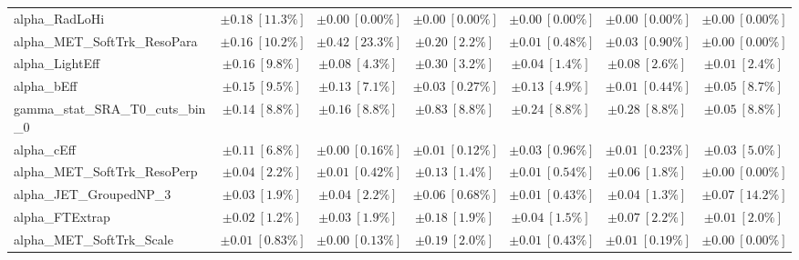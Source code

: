 \begin{sidewaystable}
\begin{center}
\begin{tabular*}{\textwidth}{@{\extracolsep{\fill}}lcccccc}
alpha\_RadLoHi         & $\pm 0.18\ [11.3\%] $          & $\pm 0.00\ [0.00\%] $          & $\pm 0.00\ [0.00\%] $          & $\pm 0.00\ [0.00\%] $          & $\pm 0.00\ [0.00\%] $          & $\pm 0.00\ [0.00\%] $       \\
alpha\_MET\_SoftTrk\_ResoPara         & $\pm 0.16\ [10.2\%] $          & $\pm 0.42\ [23.3\%] $          & $\pm 0.20\ [2.2\%] $          & $\pm 0.01\ [0.48\%] $          & $\pm 0.03\ [0.90\%] $          & $\pm 0.00\ [0.00\%] $       \\
alpha\_LightEff         & $\pm 0.16\ [9.8\%] $          & $\pm 0.08\ [4.3\%] $          & $\pm 0.30\ [3.2\%] $          & $\pm 0.04\ [1.4\%] $          & $\pm 0.08\ [2.6\%] $          & $\pm 0.01\ [2.4\%] $       \\
alpha\_bEff         & $\pm 0.15\ [9.5\%] $          & $\pm 0.13\ [7.1\%] $          & $\pm 0.03\ [0.27\%] $          & $\pm 0.13\ [4.9\%] $          & $\pm 0.01\ [0.44\%] $          & $\pm 0.05\ [8.7\%] $       \\
gamma\_stat\_SRA\_T0\_cuts\_bin\_0         & $\pm 0.14\ [8.8\%] $          & $\pm 0.16\ [8.8\%] $          & $\pm 0.83\ [8.8\%] $          & $\pm 0.24\ [8.8\%] $          & $\pm 0.28\ [8.8\%] $          & $\pm 0.05\ [8.8\%] $       \\
alpha\_cEff         & $\pm 0.11\ [6.8\%] $          & $\pm 0.00\ [0.16\%] $          & $\pm 0.01\ [0.12\%] $          & $\pm 0.03\ [0.96\%] $          & $\pm 0.01\ [0.23\%] $          & $\pm 0.03\ [5.0\%] $       \\
alpha\_MET\_SoftTrk\_ResoPerp         & $\pm 0.04\ [2.2\%] $          & $\pm 0.01\ [0.42\%] $          & $\pm 0.13\ [1.4\%] $          & $\pm 0.01\ [0.54\%] $          & $\pm 0.06\ [1.8\%] $          & $\pm 0.00\ [0.00\%] $       \\
alpha\_JET\_GroupedNP\_3         & $\pm 0.03\ [1.9\%] $          & $\pm 0.04\ [2.2\%] $          & $\pm 0.06\ [0.68\%] $          & $\pm 0.01\ [0.43\%] $          & $\pm 0.04\ [1.3\%] $          & $\pm 0.07\ [14.2\%] $       \\
alpha\_FTExtrap         & $\pm 0.02\ [1.2\%] $          & $\pm 0.03\ [1.9\%] $          & $\pm 0.18\ [1.9\%] $          & $\pm 0.04\ [1.5\%] $          & $\pm 0.07\ [2.2\%] $          & $\pm 0.01\ [2.0\%] $       \\
alpha\_MET\_SoftTrk\_Scale         & $\pm 0.01\ [0.83\%] $          & $\pm 0.00\ [0.13\%] $          & $\pm 0.19\ [2.0\%] $          & $\pm 0.01\ [0.43\%] $          & $\pm 0.01\ [0.19\%] $          & $\pm 0.00\ [0.00\%] $       \\

\end{tabular*}
\end{center}
\end{sidewaystable}

